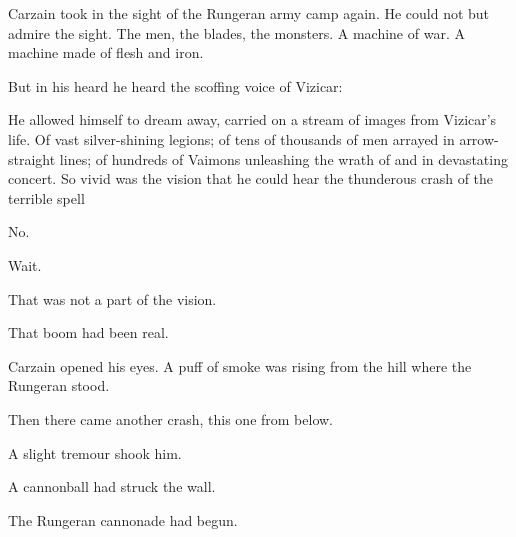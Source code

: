 Carzain took in the sight of the Rungeran army camp again. 
He could not but admire the sight. 
The men, the blades, the monsters.
A machine of war.
A machine made of flesh and iron.

But in his heard he heard the scoffing voice of Vizicar:

He allowed himself to dream away, carried on a stream of images from Vizicar's life.
Of vast silver-shining legions; 
 of tens of thousands of men arrayed in arrow-straight lines; 
 of hundreds of Vaimons unleashing the wrath of \iquin and \itzach in devastating concert. 
So vivid was the vision that he could hear the thunderous crash of the terrible spell\prikker

No. 

Wait.

That was not a part of the vision. 

That boom had been real. 

Carzain opened his eyes. 
A puff of smoke was rising from the hill where the Rungeran \ishrah stood. 


Then there came another crash, this one from below. 

A slight tremour shook him. 

A cannonball had struck the wall.

The Rungeran cannonade had begun. 









